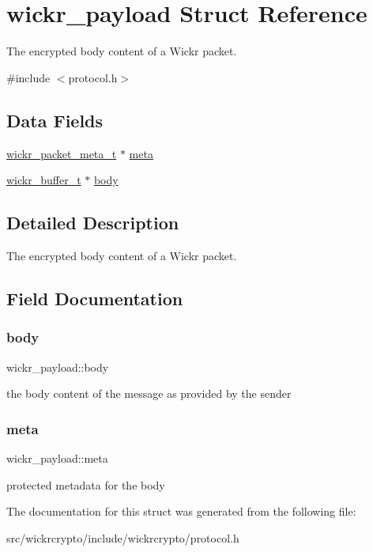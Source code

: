 \hypertarget{structwickr__payload}{}\section{wickr\+\_\+payload Struct Reference}
\label{structwickr__payload}


The encrypted body content of a Wickr packet.  




{\ttfamily \#include $<$protocol.\+h$>$}

\subsection*{Data Fields}
\begin{DoxyCompactItemize}
\item 
\mbox{\hyperlink{structwickr__packet__meta}{wickr\+\_\+packet\+\_\+meta\+\_\+t}} $\ast$ \mbox{\hyperlink{structwickr__payload_a7df63984a660a0c09c166d60b213213f}{meta}}
\item 
\mbox{\hyperlink{structwickr__buffer}{wickr\+\_\+buffer\+\_\+t}} $\ast$ \mbox{\hyperlink{structwickr__payload_a6ef1b92ffd07c37b86202b4cc88a0522}{body}}
\end{DoxyCompactItemize}


\subsection{Detailed Description}
The encrypted body content of a Wickr packet. 

\subsection{Field Documentation}
\mbox{\label{structwickr__payload_a6ef1b92ffd07c37b86202b4cc88a0522}} 
\subsubsection{\texorpdfstring{body}{body}}
{\footnotesize\ttfamily wickr\+\_\+payload\+::body}

the body content of the message as provided by the sender \mbox{\label{structwickr__payload_a7df63984a660a0c09c166d60b213213f}} 
\subsubsection{\texorpdfstring{meta}{meta}}
{\footnotesize\ttfamily wickr\+\_\+payload\+::meta}

protected metadata for the body 

The documentation for this struct was generated from the following file\+:\begin{DoxyCompactItemize}
\item 
src/wickrcrypto/include/wickrcrypto/protocol.\+h\end{DoxyCompactItemize}
